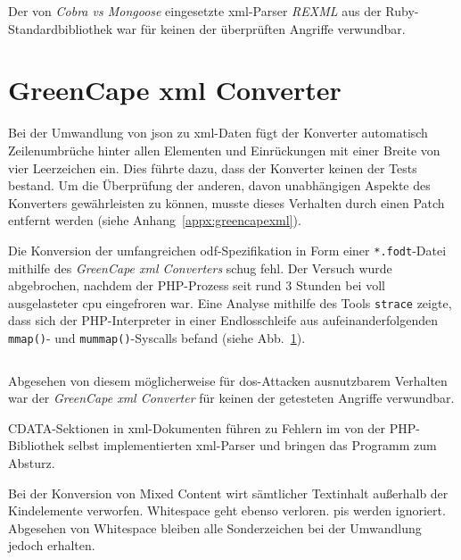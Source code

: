 Der von \emph{Cobra vs Mongoose} eingesetzte \acrshort{xml}-Parser \emph{REXML} aus der Ruby\hyp{}Standardbibliothek war für keinen der überprüften Angriffe verwundbar.

\section{GreenCape \acrshort{xml} Converter}
\label{sec:greencapexml}

Bei der Umwandlung von \acrshort{json} zu \acrshort{xml}-Daten fügt der Konverter automatisch Zeilenumbrüche hinter allen Elementen und Einrückungen mit einer Breite von vier Leerzeichen ein. Dies führte dazu, dass der Konverter keinen der Tests bestand. Um die Überprüfung der anderen, davon unabhängigen Aspekte des Konverters gewährleisten zu können, musste dieses Verhalten durch einen Patch entfernt werden (siehe Anhang~\ref{appx:greencapexml}).

Die Konversion der umfangreichen \acrshort{odf}-Spezifikation in Form einer \texttt{*.fodt}-Datei mithilfe des \emph{GreenCape \acrshort{xml} Converters} schug fehl. Der Versuch wurde abgebrochen, nachdem der PHP-Prozess seit rund 3 Stunden bei voll ausgelasteter \acrshort{cpu} eingefroren war. Eine Analyse mithilfe des Tools \texttt{strace} zeigte, dass sich der PHP-Interpreter in einer Endlosschleife aus aufeinanderfolgenden \texttt{mmap()}- und \texttt{mummap()}-Syscalls befand (siehe Abb.~\ref{fig:greencapeloop}).

\begin{figure}[h!]
    \inputminted{shell-session}{greencapexml-strace.txt}
    \label{fig:greencapeloop}
\end{figure}

Abgesehen von diesem möglicherweise für \acrshort{dos}-Attacken ausnutzbarem Verhalten war der \emph{GreenCape \acrshort{xml} Converter} für keinen der getesteten Angriffe verwundbar.

CDATA-Sektionen in \acrshort{xml}-Dokumenten führen zu Fehlern im von der PHP-Bibliothek selbst implementierten \acrshort{xml}-Parser und bringen das Programm zum Absturz.

Bei der Konversion von Mixed Content wirt sämtlicher Textinhalt außerhalb der Kindelemente verworfen. Whitespace geht ebenso verloren. \glspl{pi} werden ignoriert. Abgesehen von Whitespace bleiben alle Sonderzeichen bei der Umwandlung jedoch erhalten.

